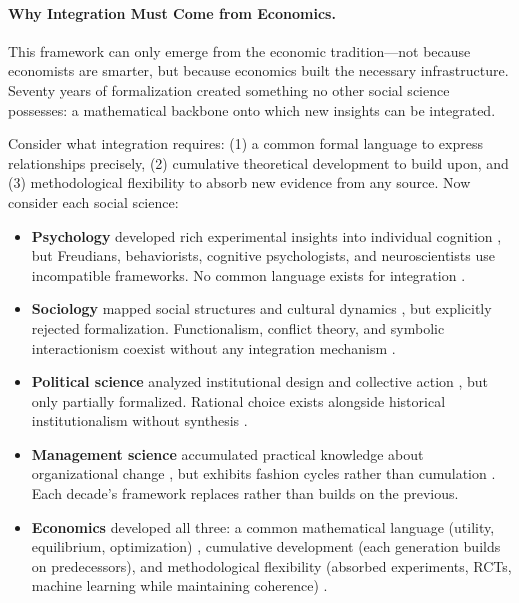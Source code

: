 \paragraph{Why Integration Must Come from Economics.}
This framework can only emerge from the economic tradition---not because economists are smarter, but because economics built the necessary infrastructure. Seventy years of formalization created something no other social science possesses: a mathematical backbone onto which new insights can be integrated.

Consider what integration requires: (1) a common formal language to express relationships precisely, (2) cumulative theoretical development to build upon, and (3) methodological flexibility to absorb new evidence from any source. Now consider each social science:
\begin{itemize}
    \item \textbf{Psychology} developed rich experimental insights into individual cognition \citep{kahneman2011,stanovich2011}, but Freudians, behaviorists, cognitive psychologists, and neuroscientists use incompatible frameworks. No common language exists for integration \citep{mischel2008}.
    \item \textbf{Sociology} mapped social structures and cultural dynamics \citep{merton1968,giddens1984}, but explicitly rejected formalization. Functionalism, conflict theory, and symbolic interactionism coexist without any integration mechanism \citep{collins1994}.
    \item \textbf{Political science} analyzed institutional design and collective action \citep{ostrom1990,olson1965}, but only partially formalized. Rational choice exists alongside historical institutionalism without synthesis \citep{hall1996}.
    \item \textbf{Management science} accumulated practical knowledge about organizational change \citep{lewin1947,kotter1996}, but exhibits fashion cycles rather than cumulation \citep{abrahamson1996}. Each decade's framework replaces rather than builds on the previous.
    \item \textbf{Economics} developed all three: a common mathematical language (utility, equilibrium, optimization) \citep{mascolell1995}, cumulative development (each generation builds on predecessors), and methodological flexibility (absorbed experiments, RCTs, machine learning while maintaining coherence) \citep{angristpischke2009}.
\end{itemize}

